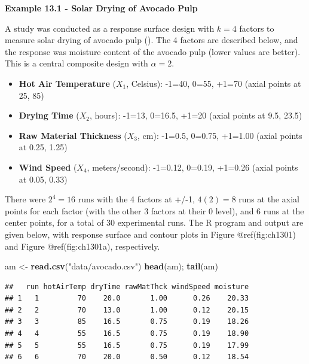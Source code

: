 \documentclass[
]{book}
\newenvironment{Shaded}{\begin{snugshade}}{\end{snugshade}}
\newcommand{\FunctionTok}[1]{\textcolor[rgb]{0.13,0.29,0.53}{\textbf{#1}}}
\newcommand{\NormalTok}[1]{#1}
\newcommand{\OtherTok}[1]{\textcolor[rgb]{0.56,0.35,0.01}{#1}}
\newcommand{\StringTok}[1]{\textcolor[rgb]{0.31,0.60,0.02}{#1}}
\providecommand{\tightlist}{%
  \setlength{\itemsep}{0pt}\setlength{\parskip}{0pt}}
\begin{document}
\textbf{Example 13.1 - Solar Drying of Avocado Pulp}

A study was conducted as a response surface design with \(k=4\) factors
to measure solar drying of avocado pulp
(). The 4 factors are described below, and the response was moisture
content of the avocado pulp (lower values are better). This is a central
composite design with \(\alpha=2\).

\begin{itemize}
\tightlist
\item
  \textbf{Hot Air Temperature} (\(X_1\), Celsius): -1=40, 0=55, +1=70
  (axial points at 25, 85)
\item
  \textbf{Drying Time} (\(X_2\), hours): -1=13, 0=16.5, +1=20 (axial
  points at 9.5, 23.5)
\item
  \textbf{Raw Material Thickness} (\(X_3\), cm): -1=0.5, 0=0.75, +1=1.00
  (axial points at 0.25, 1.25)
\item
  \textbf{Wind Speed} (\(X_4\), meters/second): -1=0.12, 0=0.19, +1=0.26
  (axial points at 0.05, 0.33)
\end{itemize}

There were \(2^4=16\) runs with the 4 factors at +/-1, \(4(2)=8\) runs
at the axial points for each factor (with the other 3 factors at their 0
level), and 6 runs at the center points, for a total of 30 experimental
runs. The R program and output are given below, with response surface
and contour plots in Figure @ref(fig:ch1301) and Figure
@ref(fig:ch1301a), respectively.

\begin{Shaded}
\begin{Highlighting}[]
\NormalTok{am }\OtherTok{\textless{}{-}} \FunctionTok{read.csv}\NormalTok{(}\StringTok{"data/avocado.csv"}\NormalTok{)}
\FunctionTok{head}\NormalTok{(am); }\FunctionTok{tail}\NormalTok{(am)}
\end{Highlighting}
\end{Shaded}

\begin{verbatim}
##   run hotAirTemp dryTime rawMatThck windSpeed moisture
## 1   1         70    20.0       1.00      0.26    20.33
## 2   2         70    13.0       1.00      0.12    20.15
## 3   3         85    16.5       0.75      0.19    18.26
## 4   4         55    16.5       0.75      0.19    18.90
## 5   5         55    16.5       0.75      0.19    17.99
## 6   6         70    20.0       0.50      0.12    18.54
\end{verbatim}
\end{document}
